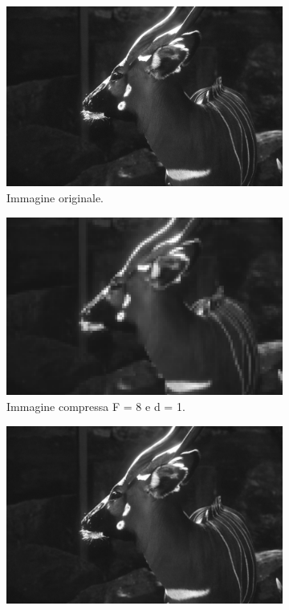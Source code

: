 \begin{figure}[!ht]
    \centering
    \begin{subfigure}[!ht]{0.45\textwidth}
        \includegraphics[width=\textwidth]{Progetto_2/img/gui.png}
        \caption{Immagine originale.}
    \end{subfigure}
    \begin{subfigure}[!ht]{0.45\textwidth}
        \includegraphics[width=\textwidth]{Progetto_2/img/gui_compressed1.png}
        \caption{Immagine compressa F = 8 e d = 1.}
    \end{subfigure}
    \begin{subfigure}[!ht]{0.45\textwidth}
        \includegraphics[width=\textwidth]{Progetto_2/img/gui_compressed.png}

\end{subfigure}
\end{figure}
